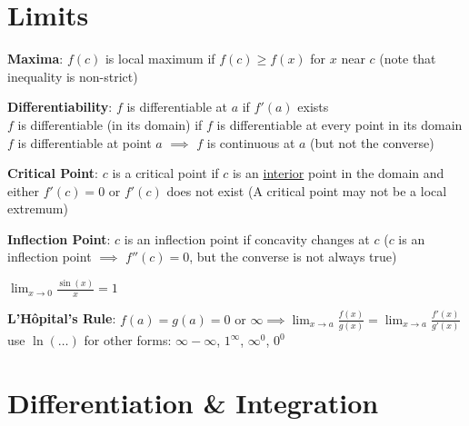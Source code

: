 \documentclass[a4paper,landscape]{article}
\newcommand{\rntopic}[1]{\section*{#1}\vspace{-0.7em}}
\newcommand{\rnname}[1]{\textbf{#1}}
\newcommand{\rnor}{\textrm{ or }}
\begin{document}
\vspace*{-\baselineskip}\leavevmode
\vspace{-1.2cm}

\begin{multicols*}{3}

\raggedright

\rntopic{Limits}


\begin{flatitemize}
\item \rnname{Maxima}: $f(c)$ is local maximum if $f(c) \geq f(x)$ for $x$ near $c$ (note that inequality is non-strict)
\item \rnname{Differentiability}: $f$ is differentiable at $a$ if $f'(a)$ exists \\ $f$ is differentiable (in its domain) if $f$ is differentiable at every point in its domain \\ $f$ is differentiable at point $a$ $\implies$ $f$ is continuous at $a$ (but not the converse)
\item \rnname{Critical Point}: $c$ is a critical point if $c$ is an \underline{interior} point in the domain and either $f'(c)=0$ or $f'(c)$ does not exist (A critical point may not be a local extremum)
\item \rnname{Inflection Point}: $c$ is an inflection point if concavity changes at $c$ ($c$ is an inflection point $\implies$ $f''(c)=0$, but the converse is not always true)

\item $\displaystyle \lim_{x\rightarrow 0} \frac{\sin \left( x \right)}{x}=1$
\item \rnname{L'Hôpital's Rule}: $\displaystyle f(a)=g(a)=0 \rnor \infty \implies \lim_{x\rightarrow a} \frac{f(x)}{g(x)} = \lim_{x\rightarrow a} \frac{f'(x)}{g'(x)}$ \\
use $\ln\left(\dots\right)$ for other forms: $\infty - \infty$, $1^\infty$, $\infty^0$, $0^0$
\end{flatitemize}

\rntopic{Differentiation \& Integration}

\begin{flatitemize}


\end{flatitemize}
\end{multicols*}
\end{document}
